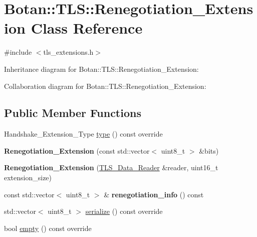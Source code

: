 \hypertarget{class_botan_1_1_t_l_s_1_1_renegotiation___extension}{}\section{Botan\+:\+:T\+LS\+:\+:Renegotiation\+\_\+\+Extension Class Reference}
\label{class_botan_1_1_t_l_s_1_1_renegotiation___extension}


{\ttfamily \#include $<$tls\+\_\+extensions.\+h$>$}



Inheritance diagram for Botan\+:\+:T\+LS\+:\+:Renegotiation\+\_\+\+Extension\+:


Collaboration diagram for Botan\+:\+:T\+LS\+:\+:Renegotiation\+\_\+\+Extension\+:
\subsection*{Public Member Functions}
\begin{DoxyCompactItemize}
\item 
Handshake\+\_\+\+Extension\+\_\+\+Type \mbox{\hyperlink{class_botan_1_1_t_l_s_1_1_renegotiation___extension_a68950eaadf339a1c739e044e9fdff665}{type}} () const override
\item 
\mbox{\label{class_botan_1_1_t_l_s_1_1_renegotiation___extension_a1a461eaa73abd486c77998260344a39e}} 
{\bfseries Renegotiation\+\_\+\+Extension} (const std\+::vector$<$ uint8\+\_\+t $>$ \&bits)
\item 
\mbox{\label{class_botan_1_1_t_l_s_1_1_renegotiation___extension_aa0723525704d44b406f92f8dca869c0a}} 
{\bfseries Renegotiation\+\_\+\+Extension} (\mbox{\hyperlink{class_botan_1_1_t_l_s_1_1_t_l_s___data___reader}{T\+L\+S\+\_\+\+Data\+\_\+\+Reader}} \&reader, uint16\+\_\+t extension\+\_\+size)
\item 
\mbox{\label{class_botan_1_1_t_l_s_1_1_renegotiation___extension_a8e82ff1913222c6af44fdeae53e63816}} 
const std\+::vector$<$ uint8\+\_\+t $>$ \& {\bfseries renegotiation\+\_\+info} () const
\item 
std\+::vector$<$ uint8\+\_\+t $>$ \mbox{\hyperlink{class_botan_1_1_t_l_s_1_1_renegotiation___extension_ae3c9adc3793b96cd2e1c0801fe0068da}{serialize}} () const override
\item 
bool \mbox{\hyperlink{class_botan_1_1_t_l_s_1_1_renegotiation___extension_a3e8751e4089301b3d9b39e7e2028573e}{empty}} () const override
\end{DoxyCompactItemize}
